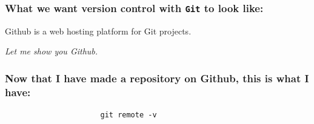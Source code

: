 \documentclass{beamer}
\begin{document}
\begin{frame}
\frametitle{What we want version control with \texttt{Git} to look like:}
\begin{center}

Github is a web hosting platform for Git projects. \pause

\textit{Let me show you Github.}
\end{center}
\end{frame}

\begin{frame}[fragile]
\frametitle{Now that I have made a repository on Github, this is what I have:}
\begin{center}
\pause

\begin{verbatim}
                      git remote -v
\end{verbatim}
\end{center}
\end{frame}
\end{document}
